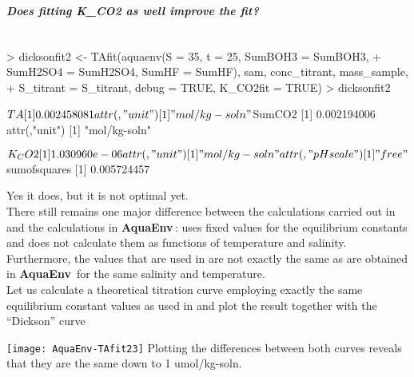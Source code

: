 \documentclass[article,nojss]{jss}
\newcommand{\aq}{\textbf{\textsf{AquaEnv}}}
\begin{document}
\subparagraph{Does fitting K\_CO2 as well improve the fit?}$\;$\\
\begin{Schunk}
\begin{Sinput}
> dicksonfit2 <- TAfit(aquaenv(S = 35, t = 25, SumBOH3 = SumBOH3, 
+     SumH2SO4 = SumH2SO4, SumHF = SumHF), sam, conc_titrant, mass_sample, 
+     S_titrant = S_titrant, debug = TRUE, K_CO2fit = TRUE)
> dicksonfit2
\end{Sinput}
\begin{Soutput}
$TA
[1] 0.002458081
attr(,"unit")
[1] "mol/kg-soln"

$SumCO2
[1] 0.002194006
attr(,"unit")
[1] "mol/kg-soln"

$K_CO2
[1] 1.030960e-06
attr(,"unit")
[1] "mol/kg-soln"
attr(,"pH scale")
[1] "free"

$sumofsquares
[1] 0.005724457
\end{Soutput}
\end{Schunk}
Yes it does, but it is not optimal yet.\\

\noindent
There still remains one major difference between the calculations carried out in \cite{Dickson1981} and the calculations in \aq$\,$:
\cite{Dickson1981} uses fixed values for the equilibrium constants and does not calculate them as functions of temperature and salinity.
Furthermore, the values that are used in \cite{Dickson1981} are not exactly the same as are obtained in \aq$\,$ for the same salinity and 
temperature.\\

Let us calculate a theoretical titration curve employing exactly the same equilibrium constant values as used in \cite{Dickson1981} and plot the
result together with the ``Dickson'' curve
\begin{Schunk}
\end{Schunk}
\texttt{[image: AquaEnv-TAfit23]}
Plotting the differences between both curves reveals that they are the same down to 1 umol/kg-soln.
\end{document}
